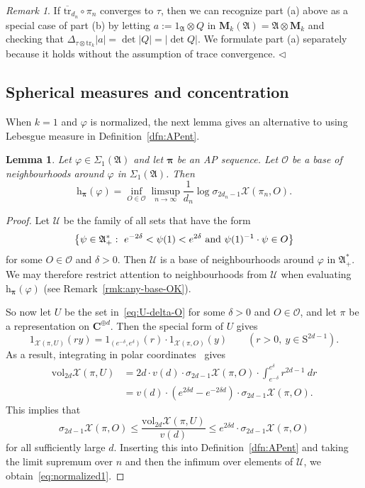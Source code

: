 \documentclass[12pt,a4paper]{article}
\numberwithin{equation}{section}
\newtheorem{lem}[thm]{Lemma}
\theoremstyle{remark}
\newtheorem{rmk}[thm]{Remark}
\renewcommand{\rm}[1]{\mathrm{#1}}
\renewcommand{\cal}[1]{\mathcal{#1}}
\newcommand{\bbC}{\mathbf{C}}
\newcommand{\rmM}{\mathbf{M}}
\newcommand{\rmh}{\mathrm{h}}
\newcommand{\X}{\mathcal{X}}
\newcommand{\A}{\mathfrak{A}}
\renewcommand{\S}{\Sigma}
\renewcommand{\phi}{\varphi}
\newcommand{\s}{\sigma}
\newcommand{\fin}{\nolinebreak\hspace{\stretch{1}}$\lhd$}
\newcommand{\bspi}{\boldsymbol{\pi}}
\newcommand{\vol}{\mathrm{vol}}
\newcommand{\tr}{\overline{\mathrm{tr}}}
\newcommand{\Tr}{\mathrm{tr}}
\begin{document}
\begin{rmk}
If ${\tr_{d_n}\circ \pi_n}$ converges to $\tau$, then we can recognize part (a) above as a special case of part (b) by letting $a := 1_\A\otimes Q$ in $\rmM_k(\A) = \A\otimes\rmM_k$ and checking that $\Delta_{\tau\otimes \Tr_k}|a| = \det |Q| = |\det Q|$.  We formulate part (a) separately because it holds without the assumption of trace convergence. \fin
\end{rmk}


\subsection{Spherical measures and concentration}

When $k=1$ and $\phi$ is normalized, the next lemma gives an alternative to using Lebesgue measure in Definition~\ref{dfn:APent}.

\begin{lem}\label{lem:normalized}
Let $\phi \in \S_1(\A)$ and let $\bspi$ be an AP sequence. Let $\cal{O}$ be a base of neighbourhoods around $\phi$ in $\S_1(\A)$. Then
\begin{equation}\label{eq:normalized1}
 \rmh_{\bspi}(\phi) = \inf_{O \in \cal{O}} \limsup_{n \to\infty} \frac{1}{d_n}\log \s_{2d_n-1}\X(\pi_n,O).
 \end{equation}
\end{lem}

\begin{proof}
Let $\cal{U}$ be the family of all sets that have the form
\begin{equation}\label{eq:U-delta-O}
\big\{\psi \in \A_+^\ast:\ e^{-2\delta} < \psi(1) < e^{2\delta}\ \hbox{and}\ \psi(1)^{-1}\cdot \psi \in O\big\}
\end{equation}
for some $O \in \cal{O}$ and $\delta > 0$.  Then $\cal{U}$ is a base of neighbourhoods around $\phi$ in $\A_+^\ast$.  We may therefore restrict attention to neighbourhoods from $\cal{U}$ when evaluating $\rmh_{\bspi}(\phi)$ (see Remark~\ref{rmk:any-base-OK}).

So now let $U$ be the set in~\eqref{eq:U-delta-O} for some $\delta > 0$ and $O \in \cal{O}$, and let $\pi$ be a representation on $\bbC^{\oplus d}$.  Then the special form of $U$ gives
\[1_{\X(\pi,U)}(ry) = 1_{(e^{-\delta},e^\delta)}(r)\cdot 1_{\X(\pi,O)}(y) \qquad (r > 0,\ y \in \rm{S}^{2d-1}).\]
As a result, integrating in polar coordinates~\cite[Subsec. 1.4.3]{RudinFTUB} gives
\begin{align*}
\vol_{2d}\X(\pi,U) &= 2d\cdot v(d)\cdot\s_{2d-1}\X(\pi,O)\cdot \int_{e^{-\delta}}^{e^\delta} r^{2d-1}\ dr\\
&= v(d)\cdot (e^{2\delta d} - e^{-2\delta d})\cdot\s_{2d-1}\X(\pi,O).
\end{align*}
This implies that
\[\s_{2d-1}\X(\pi,O) \le \frac{\vol_{2d}\X(\pi,U)}{v(d)} \le e^{2\delta d}\cdot\s_{2d-1}\X(\pi,O)\]
for all sufficiently large $d$. Inserting this into Definition~\ref{dfn:APent} and taking the limit supremum over $n$ and then the infimum over elements of $\cal{U}$, we obtain~\eqref{eq:normalized1}.
\end{proof}
\end{document}
